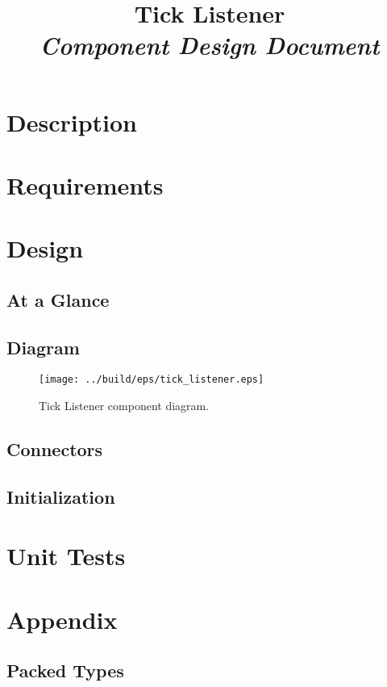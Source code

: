 



\title{\textbf{Tick Listener} \\
\large\textit{Component Design Document}}
\date{}
\maketitle

\section{Description}


\section{Requirements}


\section{Design}

\subsection{At a Glance}


\subsection{Diagram}
\begin{figure}[H]
  \texttt{[image: ../build/eps/tick\_listener.eps]}
  \caption{Tick Listener component diagram.}
\end{figure}

\subsection{Connectors}


\subsection{Initialization}


\section{Unit Tests}



\section{Appendix}
\subsection{Packed Types}




